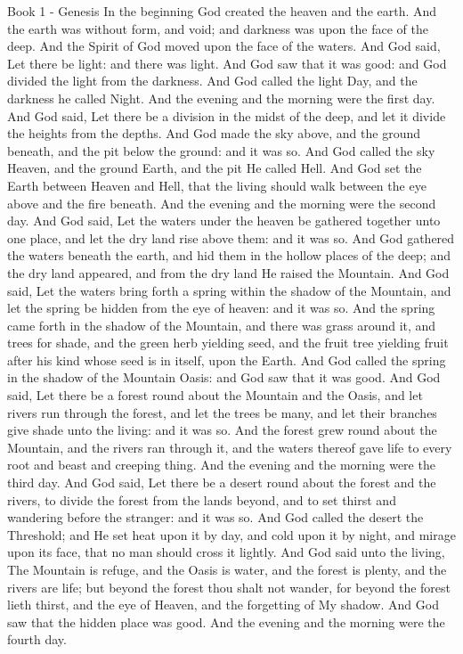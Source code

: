 ﻿Book 1 - Genesis
In the beginning God created the heaven and the earth. And the earth was without form, and void; and darkness was upon the face of the deep. And the Spirit of God moved upon the face of the waters. And God said, Let there be light: and there was light. And God saw that it was good: and God divided the light from the darkness. And God called the light Day, and the darkness he called Night. And the evening and the morning were the first day.
And God said, Let there be a division in the midst of the deep, and let it divide the heights from the depths. And God made the sky above, and the ground beneath, and the pit below the ground: and it was so. And God called the sky Heaven, and the ground Earth, and the pit He called Hell. And God set the Earth between Heaven and Hell, that the living should walk between the eye above and the fire beneath. And the evening and the morning were the second day.
And God said, Let the waters under the heaven be gathered together unto one place, and let the dry land rise above them: and it was so. And God gathered the waters beneath the earth, and hid them in the hollow places of the deep; and the dry land appeared, and from the dry land He raised the Mountain. And God said, Let the waters bring forth a spring within the shadow of the Mountain, and let the spring be hidden from the eye of heaven: and it was so. And the spring came forth in the shadow of the Mountain, and there was grass around it, and trees for shade, and the green herb yielding seed, and the fruit tree yielding fruit after his kind whose seed is in itself, upon the Earth. And God called the spring in the shadow of the Mountain Oasis: and God saw that it was good. And God said, Let there be a forest round about the Mountain and the Oasis, and let rivers run through the forest, and let the trees be many, and let their branches give shade unto the living: and it was so. And the forest grew round about the Mountain, and the rivers ran through it, and the waters thereof gave life to every root and beast and creeping thing. And the evening and the morning were the third day.
And God said, Let there be a desert round about the forest and the rivers, to divide the forest from the lands beyond, and to set thirst and wandering before the stranger: and it was so. And God called the desert the Threshold; and He set heat upon it by day, and cold upon it by night, and mirage upon its face, that no man should cross it lightly. And God said unto the living, The Mountain is refuge, and the Oasis is water, and the forest is plenty, and the rivers are life; but beyond the forest thou shalt not wander, for beyond the forest lieth thirst, and the eye of Heaven, and the forgetting of My shadow. And God saw that the hidden place was good. And the evening and the morning were the fourth day.
